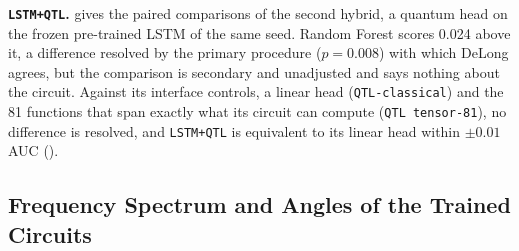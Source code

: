 \documentclass[11pt,a4paper]{article}
\begin{document}
\textbf{\texttt{LSTM+QTL}.}  gives the paired comparisons of the second hybrid, a quantum head on the frozen pre-trained LSTM of the same seed. Random Forest scores 0.024 above it, a difference resolved by the primary procedure ($p=0.008$) with which DeLong agrees, but the comparison is secondary and unadjusted and says nothing about the circuit. Against its interface controls, a linear head (\texttt{QTL-classical}) and the 81 functions that span exactly what its circuit can compute (\texttt{QTL tensor-81}), no difference is resolved, and \texttt{LSTM+QTL} is equivalent to its linear head within $\pm0.01$ AUC ().

\begin{table}[htbp]
\centering
\caption{Paired comparisons of \texttt{LSTM+QTL} (15-seed means; procedures and notation as in ). Secondary analysis: $p$-values unadjusted.}
\label{tab:qtl_paired}
{\small
{}}
\end{table}

\subsection{Frequency Spectrum and Angles of the Trained Circuits}
\label{app:spectrum}
\end{document}
